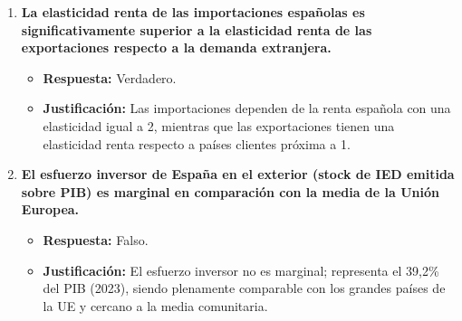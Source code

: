 \begin{enumerate}[label=\textbf{Pregunta \arabic*:}, leftmargin=*, itemsep=4ex]
\item \textbf{La elasticidad renta de las importaciones españolas es significativamente superior a la elasticidad renta de las exportaciones respecto a la demanda extranjera.}
    \begin{itemize}
        \item \textbf{Respuesta:} \textcolor{blue!80!black}{Verdadero.}
        \item \textbf{Justificación:} Las importaciones dependen de la renta española con una elasticidad igual a 2, mientras que las exportaciones tienen una elasticidad renta respecto a países clientes próxima a 1.
    \end{itemize}

\item \textbf{El esfuerzo inversor de España en el exterior (stock de IED emitida sobre PIB) es marginal en comparación con la media de la Unión Europea.}
    \begin{itemize}
        \item \textbf{Respuesta:} \textcolor{red!80!black}{Falso.}
        \item \textbf{Justificación:} El esfuerzo inversor no es marginal; representa el 39,2\% del PIB (2023), siendo plenamente comparable con los grandes países de la UE y cercano a la media comunitaria.
    \end{itemize}

\end{enumerate}
